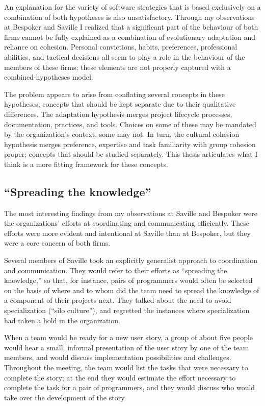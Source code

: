 An explanation for the variety of software strategies that is based exclusively on a combination of both hypotheses is also unsatisfactory. Through my observations at Bespoker and Saville I realized that a significant part of the behaviour of both firms cannot be fully explained as a combination of evolutionary adaptation and reliance on cohesion. Personal convictions, habits, preferences, professional abilities, and tactical decisions all seem to play a role in the behaviour of the members of these firms; these elements are not properly captured with a combined-hypotheses model.

The problem appears to arise from conflating several concepts in these hypotheses; concepts that should be kept separate due to their qualitative differences. The adaptation hypothesis merges project lifecycle processes, documentation, practices, and tools. Choices on some of these may be mandated by the organization's context, some may not. In turn, the cultural cohesion hypothesis merges preference, expertise and task familiarity with group cohesion proper; concepts that should be studied separately. This thesis articulates what I think is a more fitting framework for these concepts.


\subsection{``Spreading the knowledge''}
\label{sec:Spreading}

The most interesting findings from my observations at Saville and Bespoker were the organizations' efforts at coordinating and communicating efficiently. These efforts were more evident and intentional at Saville than at Bespoker, but they were a core concern of both firms.

Several members of Saville took an explicitly generalist approach to coordination and communication. They would refer to their efforts as ``spreading the knowledge,'' so that, for instance, pairs of programmers would often be selected on the basis of where and to whom did the team need to spread the knowledge of a component of their projects next. They talked about the need to avoid specialization (``silo culture''), and regretted the instances where specialization had taken a hold in the organization.

When a team would be ready for a new user story, a group of about five people would hear a small, informal presentation of the user story by one of the team members, and would discuss implementation possibilities and challenges. Throughout the meeting, the team would list the tasks that were necessary to complete the story; at the end they would estimate the effort necessary to complete the task for a pair of programmers, and they would discuss who would take over the development of the story.

